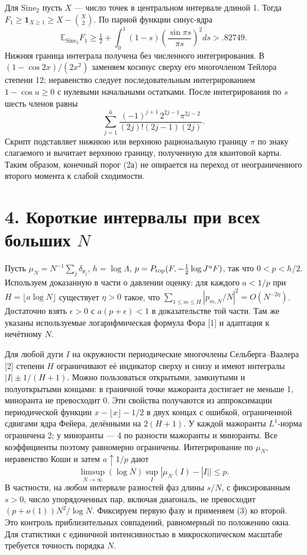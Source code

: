 \documentclass[11pt,a4paper]{article}
\newcommand{\EE}{\mathbb E}
\newcommand{\si}{\mathrm{Sine}_2}
\newcommand{\sect}[1]{\section*{\sffamily\color{ink}#1}}
\begin{document}
Для $\si$ пусть $X$ --- число точек в центральном интервале длиной 1. Тогда $F_1\ge\mathbf1_{X\ge1}\ge X-\binom X2$. По парной функции синус-ядра
\[
 \EE_{\si}F_1\ge\tfrac12+\int_0^1(1-s)
       \left(\frac{\sin\pi s}{\pi s}\right)^2ds>.82749.
\]
Нижняя граница интеграла получена без численного интегрирования. В $(1-\cos 2x)/(2x^2)$ заменяем косинус сверху его многочленом Тейлора степени 12; неравенство следует последовательным интегрированием $1-\cos u\ge0$ с нулевыми начальными остатками. После интегрирования по $s$ шесть членов равны
\[
 \sum_{j=1}^6\frac{(-1)^{j+1}\,2^{2j-1}\pi^{2j-2}}{(2j)!(2j-1)(2j)} .
\]
Скрипт подставляет нижнюю или верхнюю рациональную границу $\pi$ по знаку слагаемого и вычитает верхнюю границу, полученную для квантовой карты. Таким образом, конечный порог (2а) не опирается на переход от неограниченного второго момента к слабой сходимости.
\newpage
\sect{4. Короткие интервалы при всех больших $N$}
Пусть $\mu_N=N^{-1}\sum_j\delta_{\theta_j}$, $h=\log\Lambda$, $p=P_{\rm top}(F,-\frac12\log J^uF)$, так что $0<p<h/2$. Используем доказанную в части о давлении оценку: для каждого $a<1/p$ при $H=\lfloor a\log N\rfloor$ существует $\eta>0$ такое, что $\sum_{1\le m\le H}|p_{m,N}/N|^2=O(N^{-2\eta})$. Достаточно взять $\epsilon>0$ с $a(p+\epsilon)<1$ в доказательстве той части. Там же указаны используемые логарифмическая формула Фора [1] и адаптация к нечётному $N$.

Для любой дуги $I$ на окружности периодические многочлены Сельберга--Ваалера [2] степени $H$ ограничивают её индикатор сверху и снизу и имеют интегралы $|I|\pm1/(H+1)$. Можно пользоваться открытыми, замкнутыми и полуоткрытыми концами: в граничной точке мажоранта достигает не меньше 1, миноранта не превосходит 0. Эти свойства получаются из аппроксимации периодической функции $x-\lfloor x\rfloor-1/2$ в двух концах с ошибкой, ограниченной сдвигами ядра Фейера, делёнными на $2(H+1)$. У каждой мажоранты $L^1$-норма ограничена 2; у миноранты --- 4 по разности мажоранты и миноранты. Все коэффициенты поэтому равномерно ограничены. Интегрирование по $\mu_N$, неравенство Коши и затем $a\uparrow1/p$ дают
\[
 \limsup_{N\to\infty}(\log N)\sup_I|\mu_N(I)-|I||\le p.                  \tag{3}
\]
В частности, на \emph{любом} интервале разностей фаз длины $s/N$, с фиксированным $s>0$, число упорядоченных пар, включая диагональ, не превосходит $(p+o(1))N^2/\log N$. Фиксируем первую фазу и применяем (3) ко второй. Это контроль приблизительных совпадений, равномерный по положению окна. Для статистики с единичной интенсивностью в микроскопическом масштабе требуется точность порядка $N$.
\end{document}
